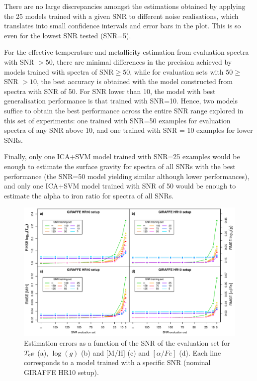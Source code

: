 \documentclass[a4paper,fleqn,usenatbib]{mnras}
\begin{document}
{There are no large discrepancies amongst the estimations
obtained by applying the 25 models trained with a given SNR to
different noise realisations, which translates into small confidence
intervals and error bars in the plot. This is so even for the lowest
SNR tested (SNR=5).

For the effective temperature and metallicity estimation from 
evaluation spectra with SNR $ > 50$, there are minimal
differences in the precision achieved by models trained with spectra
of SNR$\ge 50$, while for evaluation sets with $50 \ge$ SNR $> 10$, 
the best accuracy is obtained with the model constructed from spectra 
with SNR of 50. For SNR lower than 10, the model with best generalisation
performance is that trained with SNR=10. Hence, two models suffice to 
obtain the best performance across the entire SNR range explored in 
this set of experiments: one trained with SNR=50 examples for evaluation 
spectra of any SNR above 10, and one trained with SNR = 10 examples 
for lower SNRs. 

Finally, only one ICA+SVM model trained with SNR=25 examples would be enough to
estimate the surface gravity for spectra of all SNRs with the best
performance (the SNR=50 model yielding similar although lower performances), 
and only one ICA+SVM model trained with SNR of 50 would be enough to
estimate the alpha to iron ratio for spectra of all SNRs.

\begin{figure}
\centering\includegraphics[width=\textwidth]{snr_errors_log_global_2x2.pdf}
\caption{Estimation errors as a function of the SNR of the evaluation
  set for $T_{\rm eff}$ (a), $\log(g)$ (b) and [M/H] (c) and
  $\left[ \alpha/Fe \right]$ (d). Each line corresponds to a model 
  trained with a specific SNR (nominal GIRAFFE HR10 setup).}
\label{fig:snrtrain}
\end{figure}

}
\end{document}
